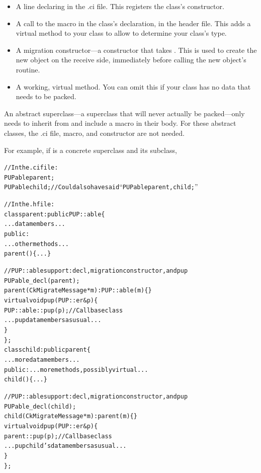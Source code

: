 \begin{itemize}
\item A line declaring  in the .ci file.
This registers the class's constructor.

\item A call to the macro  in the
class's declaration, in the header file.  This adds a virtual 
method to your class to allow  to determine your class's type.

\item A migration constructor---a constructor that takes .
This is used to create the new object on the receive side, immediately
before calling the new object's  routine.

\item A working, virtual  method.  You can omit this if your
class has no data that needs to be packed.
\end{itemize}

An abstract superclass---a superclass that will never actually be 
packed---only needs to inherit from  and include a 
 macro in their body.  For
these abstract classes, the 
.ci file,  macro, and constructor are not needed.

For example, if  is a concrete superclass and  its
subclass,

\begin{alltt}
//In the .ci file:
   PUPable parent;
   PUPable child; //Could also have said ``PUPable parent, child;''

//In the .h file:
class parent : public PUP::able \{
    ... data members ...
public:
    ... other methods ...
    parent() \{...\}
    
    //PUP::able support: decl, migration constructor, and pup
    PUPable\_decl(parent);  
    parent(CkMigrateMessage *m) : PUP::able(m) \{\}
    virtual void pup(PUP::er &p) \{
        PUP::able::pup(p);//Call base class
        ... pup data members as usual ...
    \}  
\};
class child : public parent \{
    ... more data members ...
public:    ... more methods, possibly virtual ...
    child() \{...\}
    
    //PUP::able support: decl, migration constructor, and pup
    PUPable\_decl(child);  
    child(CkMigrateMessage *m) : parent(m) \{\}
    virtual void pup(PUP::er &p) \{
        parent::pup(p);//Call base class
        ... pup child's data members as usual ...
    \}  
\};

\end{alltt}

